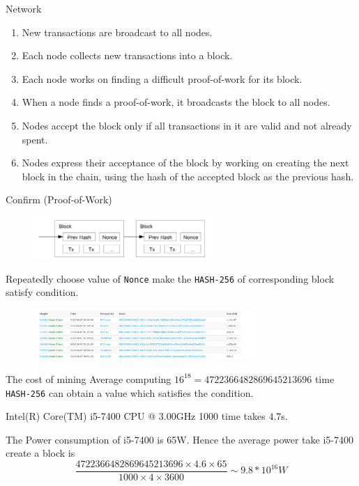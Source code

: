 \documentclass[serif]{beamer}
\begin{document}
	
	\begin{frame}{Network}
		\begin{enumerate}[<+->]
			\item New transactions are broadcast to all nodes.
			\item Each node collects new transactions into a block.
			\item Each node works on finding a difficult proof-of-work for its block.
			\item When a node finds a proof-of-work, it broadcasts the block to all nodes.
			\item Nodes accept the block only if all transactions in it are valid and not already spent.
			\item Nodes express their acceptance of the block by working on creating the next block in the
			chain, using the hash of the accepted block as the previous hash.
		\end{enumerate}
		
	\end{frame}
		\begin{frame}{Confirm (Proof-of-Work)}
			\begin{figure}
				\includegraphics[width=0.6\textwidth]{proof}
				\label{fig:result3}
			\end{figure}
			Repeatedly choose value  of {\tt Nonce} make the {\tt HASH-256} of corresponding block satisfy 
			condition.
			\begin{example}
				\begin{figure}
					\includegraphics[width=0.75\textwidth]{example1}
					\label{fig:result4}
				\end{figure}
			\end{example}
			
		\end{frame}
	\begin{frame}{The cost of mining}
		Average computing $16^{18}=4722366482869645213696$ time {\tt HASH-256} can obtain a value which satisfies the condition.
		\begin{example}	
			Intel(R) Core(TM) i5-7400 CPU @ 3.00GHz
			1000 time takes $4.7$s.	
		\end{example}
			The Power consumption of  i5-7400  is 65W. Hence the average power take  i5-7400 create a 
			block is $$\frac{4722366482869645213696\times 4.6\times 65}{1000\times 4\times 3600}\sim 9.8*10^{16} W$$
	\end{frame}
\end{document}
